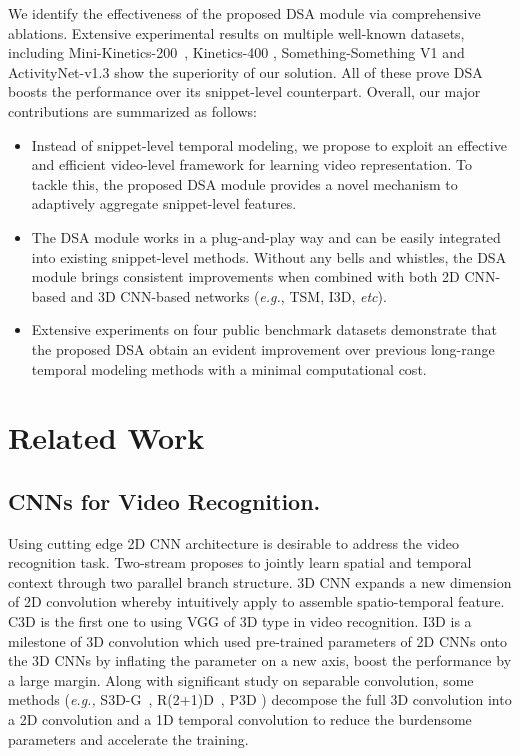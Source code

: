 \documentclass[sigconf]{acmart}
\begin{document}
We identify the effectiveness of the proposed DSA module via comprehensive ablations. Extensive experimental results on multiple well-known datasets, including Mini-Kinetics-200~\cite{s3d}, Kinetics-400 \cite{kay2017kinetics}, Something-Something V1 \cite{sth-sth} and ActivityNet-v1.3 \cite{caba2015activitynet} show the superiority of our solution. All of these prove DSA boosts the performance over its snippet-level counterpart.
Overall, our major contributions are summarized as follows:

\begin{itemize}
    \item Instead of snippet-level temporal modeling, we propose to exploit an effective and efficient video-level framework for learning video representation. To tackle this, the proposed DSA module provides a novel mechanism to adaptively aggregate snippet-level features.
    \item The DSA module works in a plug-and-play way and can be easily integrated into existing snippet-level methods. Without any bells and whistles, the DSA module brings consistent improvements when combined with both 2D CNN-based and 3D CNN-based networks (\emph{e.g.}, TSM, I3D, \emph{etc}).
    \item Extensive experiments on four public benchmark datasets demonstrate that the proposed DSA obtain an evident improvement over previous long-range temporal modeling methods with a minimal computational cost.
\end{itemize}

\section{Related Work}
\subsection{CNNs for Video Recognition.}
Using cutting edge 2D CNN architecture is desirable to address the video recognition task. 
Two-stream\cite{two-stream} proposes to jointly learn spatial and temporal context through two parallel branch structure. 
3D CNN expands a new dimension of 2D convolution whereby intuitively apply to assemble spatio-temporal feature. C3D\cite{c3d} is the first one to using VGG of 3D type in video recognition. 
I3D \cite{i3d} is a milestone of 3D convolution which used pre-trained parameters of 2D CNNs onto the 3D CNNs by inflating the parameter on a new axis, boost the performance by a large margin. 
Along with significant study on separable convolution, some methods (\emph{e.g.,} S3D-G~\cite{s3d}, R(2+1)D~\cite{r2+1d}, P3D \cite{p3d}) decompose the full 3D convolution into a 2D convolution and a 1D temporal convolution to reduce the burdensome parameters and accelerate the training. 
\end{document}
